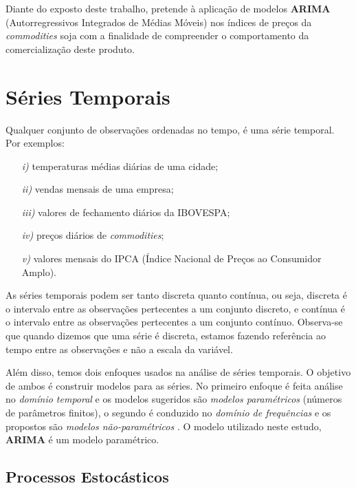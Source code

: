 \documentclass[
	12pt,				%
	openright,			%
	oneside,      %
	a4paper,			%
	english,			%
	french,				%
	spanish,			%
	brazil,				%
	]{abntex2}\usepackage[]{graphicx}\usepackage[]{xcolor}
\begin{document}
Diante do exposto deste trabalho, pretende à aplicação de modelos \textbf{ARIMA} (Autorregressivos Integrados de Médias Móveis) nos índices de preços da \textit{commodities} soja com a finalidade de compreender o comportamento da 
comercialização deste produto.


\chapter{Séries Temporais}
  
Qualquer conjunto de observações ordenadas no tempo, é uma série temporal. Por exemplos:

\begin{itemize}
  \item[\textit{i)}] temperaturas médias diárias de uma cidade;
  \item[\textit{ii)}] vendas mensais de uma empresa;
  \item[\textit{iii)}] valores de fechamento diários da IBOVESPA;
  \item[\textit{iv)}] preços diários de \textit{commodities};
  \item[\textit{v)}] valores mensais do IPCA (Índice Nacional de Preços ao Consumidor Amplo).
\end{itemize}

As séries temporais podem ser tanto discreta quanto contínua, ou seja, discreta é o 
intervalo entre as observações pertecentes a um conjunto discreto, e contínua é o 
intervalo entre as observações pertecentes a um conjunto contínuo. Observa-se que 
quando dizemos que uma série é discreta, estamos fazendo referência ao tempo entre as 
observações e não a escala da variável.

Além disso, temos dois enfoques usados na análise de séries temporais. O objetivo de ambos é construir modelos para as séries. No primeiro enfoque é feita análise no \textit{domínio temporal} e os modelos sugeridos são \textit{modelos paramétricos} (números de parâmetros finitos), o segundo é conduzido no \textit{domínio de frequências} e os propostos são 
\textit{modelos não-paramétricos} \cite{morettin2006analise}. O modelo utilizado neste 
estudo, \textbf{ARIMA} é um modelo paramétrico.




  \section{Processos Estocásticos}
  
\end{document}
